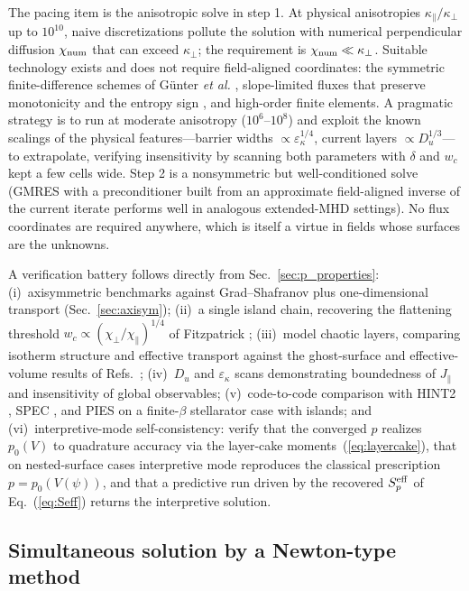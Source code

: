 \documentclass[english]{article}
\begin{document}
The pacing item is the anisotropic solve in step 1. At physical anisotropies
$\kappa_\parallel/\kappa_\perp$ up to $10^{10}$, naive discretizations pollute the solution with
numerical perpendicular diffusion $\chi_{\rm num}$ that can exceed $\kappa_\perp$; the requirement
is $\chi_{\rm num}\ll\kappa_\perp$. Suitable technology exists and does not require field-aligned
coordinates: the symmetric finite-difference schemes of G\"unter \emph{et al.}
\cite{gunter2005}, slope-limited fluxes that preserve monotonicity and the entropy sign
\cite{sharma2007}, and high-order finite elements. A pragmatic strategy is to run at moderate
anisotropy ($10^{6}$--$10^{8}$) and exploit the known scalings of the physical features---barrier
widths $\propto\varepsilon_\kappa^{1/4}$, current layers $\propto D_u^{1/3}$---to extrapolate,
verifying insensitivity by scanning both parameters with $\delta$ and $w_c$ kept a few cells wide.
Step 2 is a nonsymmetric but well-conditioned solve (GMRES with a preconditioner built from an
approximate field-aligned inverse of the current iterate performs well in analogous extended-MHD
settings). No flux coordinates are required anywhere, which is itself a virtue in fields whose
surfaces are the unknowns.

A verification battery follows directly from Sec.~\ref{sec:p_properties}: (i)~axisymmetric
benchmarks against Grad--Shafranov plus one-dimensional transport (Sec.~\ref{sec:axisym}); (ii)~a single island chain,
recovering the flattening threshold $w_c\propto(\chi_\perp/\chi_\parallel)^{1/4}$ of Fitzpatrick
\cite{fitzpatrick1995}; (iii)~model chaotic layers, comparing isotherm structure and effective
transport against the ghost-surface and effective-volume results of
Refs.~\cite{hudson2008,helander2022,paul2022}; (iv)~$D_u$ and $\varepsilon_\kappa$ scans
demonstrating boundedness of $J_\parallel$ and insensitivity of global observables;
(v)~code-to-code comparison with HINT2 \cite{suzuki2006}, SPEC \cite{hudson2012}, and PIES
\cite{reiman1986} on a finite-$\beta$ stellarator case with islands; and (vi)~interpretive-mode
self-consistency: verify that the converged $p$ realizes $p_0(V)$ to quadrature accuracy via the
layer-cake moments~(\ref{eq:layercake}), that on nested-surface cases interpretive mode reproduces
the classical prescription $p=p_0(V(\psi))$, and that a predictive run driven by the recovered
$S_p^{\rm eff}$ of Eq.~(\ref{eq:Seff}) returns the interpretive solution.

\subsection{Simultaneous solution by a Newton-type method}
\label{sec:newton}
\end{document}
